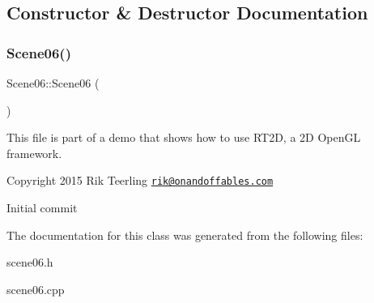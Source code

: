 \subsection{Constructor \& Destructor Documentation}
\mbox{\label{class_scene06_a0fe3319d082e484405ec497d809f20eb}} 
\subsubsection{\texorpdfstring{Scene06()}{Scene06()}}
{\footnotesize\ttfamily Scene06\+::\+Scene06 (\begin{DoxyParamCaption}{ }\end{DoxyParamCaption})}

This file is part of a demo that shows how to use R\+T2D, a 2D Open\+GL framework.


\begin{DoxyItemize}
\item Copyright 2015 Rik Teerling \href{mailto:rik@onandoffables.com}{\tt rik@onandoffables.\+com}
\begin{DoxyItemize}
\item Initial commit 
\end{DoxyItemize}
\end{DoxyItemize}

The documentation for this class was generated from the following files\+:\begin{DoxyCompactItemize}
\item 
scene06.\+h\item 
scene06.\+cpp\end{DoxyCompactItemize}
